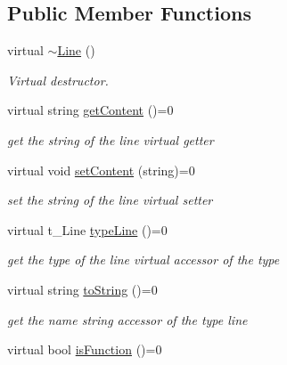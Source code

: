 \subsection*{Public Member Functions}
\begin{DoxyCompactItemize}
\item 
\hypertarget{classLine_a4a95bafcefa28672b3999deb011b9e50}{
virtual \hyperlink{classLine_a4a95bafcefa28672b3999deb011b9e50}{$\sim$Line} ()}
\label{classLine_a4a95bafcefa28672b3999deb011b9e50}

\begin{DoxyCompactList}\small\item\em Virtual destructor. \item\end{DoxyCompactList}\item 
\hypertarget{classLine_a5d33e3b08ba3367ec5e685af342b2268}{
virtual string \hyperlink{classLine_a5d33e3b08ba3367ec5e685af342b2268}{getContent} ()=0}
\label{classLine_a5d33e3b08ba3367ec5e685af342b2268}

\begin{DoxyCompactList}\small\item\em get the string of the line virtual getter \item\end{DoxyCompactList}\item 
\hypertarget{classLine_a13407b1549d23dc3a863c063bd96df05}{
virtual void \hyperlink{classLine_a13407b1549d23dc3a863c063bd96df05}{setContent} (string)=0}
\label{classLine_a13407b1549d23dc3a863c063bd96df05}

\begin{DoxyCompactList}\small\item\em set the string of the line virtual setter \item\end{DoxyCompactList}\item 
\hypertarget{classLine_aafc83899e2d7208eef2f53702c86d539}{
virtual t\_\-Line \hyperlink{classLine_aafc83899e2d7208eef2f53702c86d539}{typeLine} ()=0}
\label{classLine_aafc83899e2d7208eef2f53702c86d539}

\begin{DoxyCompactList}\small\item\em get the type of the line virtual accessor of the type \item\end{DoxyCompactList}\item 
virtual string \hyperlink{classLine_a73f822ce0aa9e95bc8fb2caf1a69b245}{toString} ()=0
\begin{DoxyCompactList}\small\item\em get the name string accessor of the type line \item\end{DoxyCompactList}\item 
\hypertarget{classLine_a0bee811e73e0c4f55ef1e12325490478}{
virtual bool \hyperlink{classLine_a0bee811e73e0c4f55ef1e12325490478}{isFunction} ()=0}
\label{classLine_a0bee811e73e0c4f55ef1e12325490478}


\end{DoxyCompactItemize}
